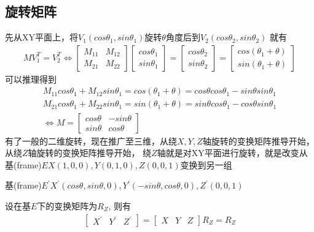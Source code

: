 \subsection{旋转矩阵}
先从XY平面上，将$V_{1}(cos\theta_{1}, sin\theta_{1})$旋转$\theta$角度后到$V_{2}(cos\theta_{2}, sin\theta_{2})$
就有
\begin{gather*}
    MV_{1}^{T} = V_{2}^{T}
    \Leftrightarrow  
    \begin{bmatrix}
        M_{11} & M_{12} \\ 
        M_{21} & M_{22}
    \end{bmatrix} 
    \begin{bmatrix}
        cos\theta_{1} \\ 
        sin\theta_{1}
    \end{bmatrix} = 
    \begin{bmatrix}
        cos\theta_{2} \\ 
        sin\theta_{2}
    \end{bmatrix} = 
    \begin{bmatrix}
        cos(\theta_{1} + \theta) \\ 
        sin(\theta_{1} + \theta)
    \end{bmatrix} 
\end{gather*}
可以推理得到
\begin{gather*}
    M_{11}cos\theta_{1} + M_{12}sin\theta_{1} = cos(\theta_{1}+\theta) = cos\theta cos\theta_{1} - sin\theta sin\theta_{1} \\
    M_{21}cos\theta_{1} + M_{22}sin\theta_{1} = sin(\theta_{1}+\theta) = sin\theta cos\theta_{1} - cos\theta sin\theta_{1} \\
    \Leftrightarrow M =   
    \begin{bmatrix}
        cos\theta & -sin\theta \\ 
        sin\theta & cos\theta
    \end{bmatrix} 
\end{gather*}
有了一般的二维旋转，现在推广至三维，从绕$X,Y,Z$轴旋转的变换矩阵推导开始，从绕$Z$轴旋转的变换矩阵推导开始，
绕$Z$轴就是对XY平面进行旋转，就是改变从基(frame)$E X(1,0,0),Y(0,1,0),Z(0,0,1)$变换到另一组
\par
基(frame)$E^{'} X^{'}(cos\theta,sin\theta,0),Y^{'}(-sin\theta,cos\theta,0),Z^{'}(0,0,1)$
\par
设在基$E$下的变换矩阵为$R_{Z}$, 则有
\begin{gather*}
    \begin{bmatrix}
        X^{'} & Y^{'} & Z^{'}
    \end{bmatrix} =   
    \begin{bmatrix}
        X & Y & Z
    \end{bmatrix} R_{Z} = R_{Z}
\end{gather*}
